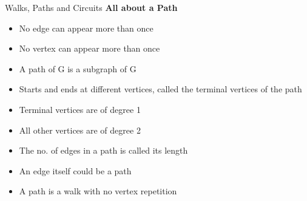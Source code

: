 \documentclass{beamer}
\begin{document}
\begin{frame}{Walks, Paths and Circuits}
	\textbf{All about a Path }
	\begin{itemize}
		\item No edge can appear more than once
		\item	No vertex can appear more than once
		\item A path of G is a subgraph of G
		\item Starts and ends at different vertices, called the terminal vertices of the path
		\item Terminal vertices are of degree 1
		\item All other vertices are of degree 2
		\item The no. of edges in a path is called its length
		\item An edge itself could be a path
		\item A path is a walk with no vertex repetition
	\end{itemize}
	
\end{frame}
\end{document}
